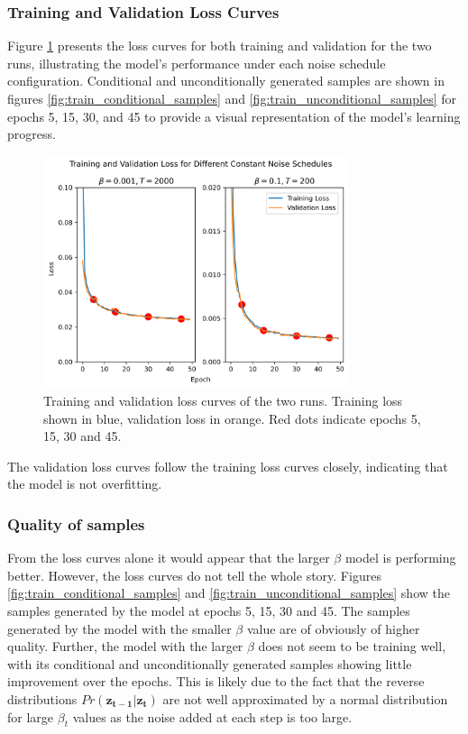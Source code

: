 \documentclass[11pt]{article}
\begin{document}
\subsubsection{Training and Validation Loss Curves}
Figure \ref{fig:q1b_loss_curves} presents the loss curves for both training and validation for the two runs, illustrating the model's performance under each noise schedule configuration. Conditional and unconditionally generated samples are shown in figures \ref{fig:train_conditional_samples} and \ref{fig:train_unconditional_samples} for epochs 5, 15, 30, and 45 to provide a visual representation of the model's learning progress.
\begin{figure}[H]
    \centering
    \includegraphics[width=0.8\textwidth]{figs/q1b_loss.png}
    \caption{Training and validation loss curves of the two runs. Training loss shown in blue, validation loss in orange. Red dots indicate epochs 5, 15, 30 and 45.}
    \label{fig:q1b_loss_curves}
\end{figure}

The validation loss curves follow the training loss curves closely, indicating that the model is not overfitting.
\subsubsection{Quality of samples}
From the loss curves alone it would appear that the larger $\beta$ model is performing better. However, the loss curves do not tell the whole story. Figures \ref{fig:train_conditional_samples} and \ref{fig:train_unconditional_samples} show the samples generated by the model at epochs 5, 15, 30 and 45. The samples generated by the model with the smaller $\beta$ value are of obviously of higher quality. Further, the model with the larger $\beta$ does not seem to be training well, with its conditional and unconditionally generated samples showing little improvement over the epochs. This is likely due to the fact that the reverse distributions $Pr(\mathbf{z_{t-1}}|\mathbf{z_{t}})$ are not well approximated by a normal distribution for large $\beta_t$ values as the noise added at each step is too large.
\end{document}
